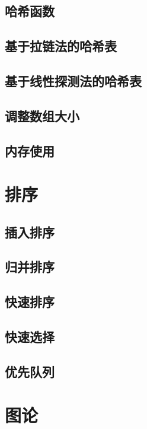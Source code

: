 \documentclass[oneside]{ctexbook}
\begin{document}
\section{哈希函数}

\section{基于拉链法的哈希表}

\section{基于线性探测法的哈希表}

\section{调整数组大小}

\section{内存使用}

\chapter{排序}

\section{插入排序}

\section{归并排序}

\section{快速排序}

\section{快速选择}

\section{优先队列}

\chapter{图论}
\end{document}
